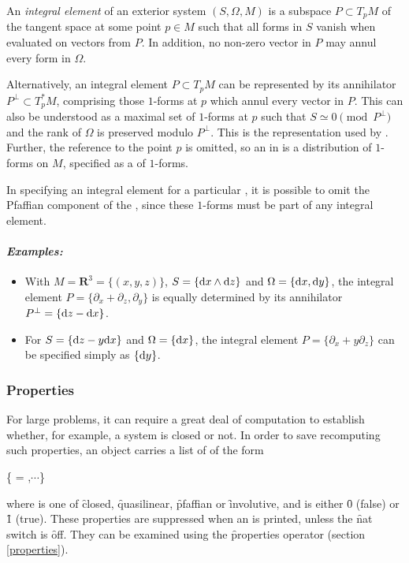 An \emph{integral element} of an exterior system $(S,\Omega,M)$ is a
subspace $P\subset T_pM$ of the tangent space at some point $p\in M$
such that all forms in $S$ vanish when evaluated on vectors from $P$. In
addition, no non-zero vector in $P$ may annul every form in $\Omega$.

Alternatively, an integral element $P\subset T_pM$ can be represented
by its annihilator $P^\perp\subset T^*_pM$, comprising those $1$-forms
at $p$ which annul every vector in $P$. This can also be understood as a
maximal set of $1$-forms at $p$ such that $S \simeq 0 \pmod{P^\perp}$ and
the rank of $\Omega$ is preserved modulo $P^\perp$.  This is the
representation used by . Further, the reference to the point $p$ is
omitted, so an  in  is a distribution of
$1$-forms on $M$, specified as a  of $1$-forms.

In specifying an integral element for a particular , it is
possible to omit the Pfaffian component of the , since these
$1$-forms must be part of any integral element.

\paragraph{\textit{Examples:}}
\begin{itemize}
\item With $M = {\mathbf{R}}^3 = \{(x,y,z)\}$, $S = \{\mathrm{d} x\wedge \mathrm{d} z\}$ and
      $\Omega = \{\mathrm{d} x,\mathrm{d} y\}$, the integral element $P =
       \{\partial_x + \partial_z,\partial_y\}$ is equally determined by its
      annihilator $P^\perp = \{\mathrm{d} z - \mathrm{d} x\}$.
\item For $S = \{\mathrm{d} z - y\mathrm{d} x\}$ and $\Omega = \{\mathrm{d} x\}$, the integral
      element $P = \{\partial_x + y\partial_z\}$ can be specified
      simply as $\{\mathrm{d} y\}$.
\end{itemize}

\subsubsection{Properties}
\label{Properties}

For large problems, it can require a great deal of computation to establish
whether, for example, a system is closed or not. In order to save
recomputing such properties, an  object carries a list of
 of the form
\begin{syntax}
	\{ = ,$\cdots$\}
\end{syntax}
where  is one of \f{closed}, \f{quasilinear}, \f{pfaffian} or
\f{involutive}, and  is either \f{0} (false) or \f{1}
(true). These properties are suppressed when an  is printed,
unless the \f{nat} switch is \f{off}. They can be examined using the
\f{properties} operator (section \ref{properties}).

